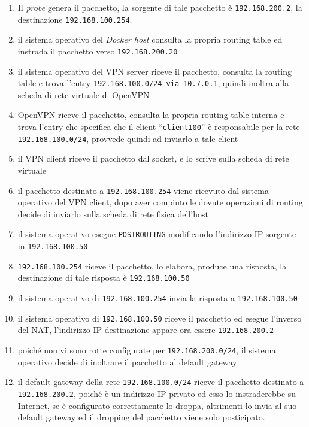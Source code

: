 \begin{enumerate}
  \item Il \textit{probe} genera il pacchetto, la sorgente di tale pacchetto è
  \texttt{192.168.200.2}, la destinazione \texttt{192.168.100.254}.
  \item il sistema operativo del \textit{Docker host} consulta la propria routing table
  ed instrada il pacchetto verso \texttt{192.168.200.20}
  \item il sistema operativo del VPN server riceve il pacchetto, consulta la
  routing table e trova l'entry \texttt{192.168.100.0/24 via 10.7.0.1}, quindi inoltra
  alla scheda di rete virtuale di OpenVPN
  \item OpenVPN riceve il pacchetto, consulta la propria routing table interna e
  trova l'entry che specifica che il client ``\texttt{client100}'' è responsabile per
  la rete \texttt{192.168.100.0/24}, provvede quindi ad inviarlo a tale client
  \item il VPN client riceve il pacchetto dal socket, e lo scrive sulla scheda di rete
  virtuale
  \item il pacchetto destinato a \texttt{192.168.100.254} viene ricevuto dal sistema
  operativo del VPN client, dopo aver compiuto le dovute operazioni di routing decide
  di inviarlo
  sulla scheda di rete fisica dell'host
  \item il sistema operativo esegue \texttt{POSTROUTING} modificando l'indirizzo IP
  sorgente in \texttt{192.168.100.50}
  \item \texttt{192.168.100.254} riceve il pacchetto, lo elabora, produce una risposta,
  la destinazione di tale risposta è \texttt{192.168.100.50}
  \item il sistema operativo di \texttt{192.168.100.254} invia la risposta a
  \texttt{192.168.100.50}
  \item il sistema operativo di \texttt{192.168.100.50} riceve il pacchetto ed
  esegue l'inverso del NAT, l'indirizzo IP destinazione appare ora essere \texttt{192.168.200.2}
  \item poiché non vi sono rotte configurate per \texttt{192.168.200.0/24}, il sistema
  operativo decide di inoltrare il pacchetto al default gateway
  \item il default gateway della rete \texttt{192.168.100.0/24} riceve il pacchetto
  destinato a \texttt{192.168.200.2}, poiché è un indirizzo IP privato ed esso
  lo instraderebbe su Internet, se è configurato correttamente lo droppa, altrimenti
  lo invia al suo default gateway ed il dropping del pacchetto viene solo posticipato.
\end{enumerate}

